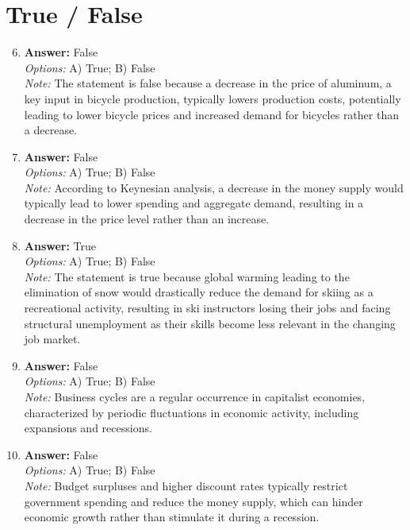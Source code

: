 \documentclass[12pt]{article}
\begin{document}
\section*{True / False}
\begin{enumerate}[label=\arabic*.]
\setcounter{enumi}{5}
\item \textbf{Answer:} False
\\ \textit{Options:} A) True; B) False
\\ \textit{Note:} The statement is false because a decrease in the price of aluminum, a key input in bicycle production, typically lowers production costs, potentially leading to lower bicycle prices and increased demand for bicycles rather than a decrease.
\item \textbf{Answer:} False
\\ \textit{Options:} A) True; B) False
\\ \textit{Note:} According to Keynesian analysis, a decrease in the money supply would typically lead to lower spending and aggregate demand, resulting in a decrease in the price level rather than an increase.
\item \textbf{Answer:} True
\\ \textit{Options:} A) True; B) False
\\ \textit{Note:} The statement is true because global warming leading to the elimination of snow would drastically reduce the demand for skiing as a recreational activity, resulting in ski instructors losing their jobs and facing structural unemployment as their skills become less relevant in the changing job market.
\item \textbf{Answer:} False
\\ \textit{Options:} A) True; B) False
\\ \textit{Note:} Business cycles are a regular occurrence in capitalist economies, characterized by periodic fluctuations in economic activity, including expansions and recessions.
\item \textbf{Answer:} False
\\ \textit{Options:} A) True; B) False
\\ \textit{Note:} Budget surpluses and higher discount rates typically restrict government spending and reduce the money supply, which can hinder economic growth rather than stimulate it during a recession.
\end{enumerate}
\end{document}
